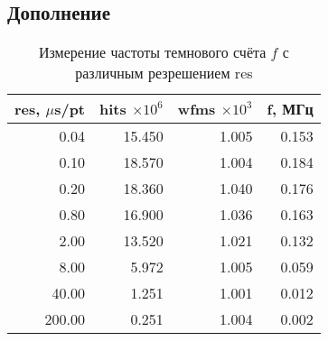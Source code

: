 \subsection*{Дополнение}


\begin{table}[h]
    \centering
    \caption{Измерение частоты темнового счёта $f$ с различным резрешением res}
\begin{tabular}{rrrr}
\toprule
   res, $\mu$s/pt&   hits $\times 10^6$ &  wfms $\times 10^3$&        f, МГц \\
\midrule
  0.04 & 15.450 & 1.005 & 0.153 \\
  0.10 & 18.570 & 1.004 & 0.184 \\
  0.20 & 18.360 & 1.040 & 0.176 \\
  0.80 & 16.900 & 1.036 & 0.163 \\
  2.00 & 13.520 & 1.021 & 0.132 \\
  8.00 &  5.972 & 1.005 & 0.059 \\
 40.00 &  1.251 & 1.001 & 0.012 \\
200.00 &  0.251 & 1.004 & 0.002 \\
\bottomrule
\end{tabular}
\end{table}

\phantom{42}